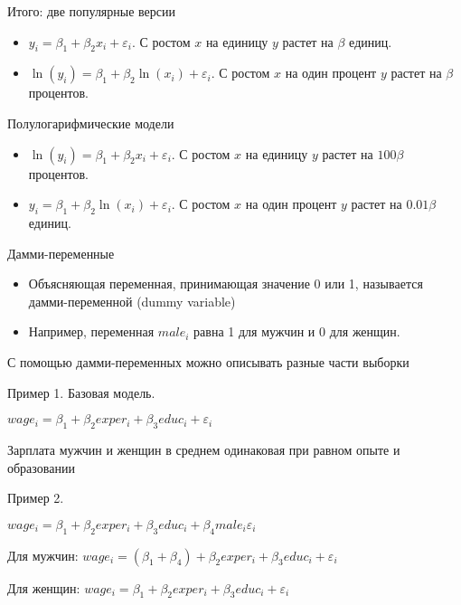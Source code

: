 \documentclass[ignorenonframetext,]{beamer}
\begin{document}
\begin{frame}{Итого: две популярные версии}

\begin{itemize}
\item
  $y_i = \beta_1 + \beta_2 x_i + \varepsilon_i$. С ростом $x$ на единицу
  $y$ растет на $\beta$ единиц.
\item
  $\ln( y_i) = \beta_1 + \beta_2 \ln( x_i) + \varepsilon_i$. С ростом
  $x$ на один процент $y$ растет на $\beta$ процентов.
\end{itemize}

\end{frame}

\begin{frame}{Полулогарифмические модели}

\begin{itemize}
\item
  $\ln( y_i) = \beta_1 + \beta_2 x_i + \varepsilon_i$. С ростом $x$ на
  единицу $y$ растет на $100\beta$ процентов.
\item
  $y_i = \beta_1 + \beta_2 \ln( x_i) + \varepsilon_i$. С ростом $x$ на
  один процент $y$ растет на $0.01\beta$ единиц.
\end{itemize}

\end{frame}

\begin{frame}{Дамми-переменные}

\begin{itemize}
\item
  Объясняющая переменная, принимающая значение 0 или 1, называется
  дамми-переменной (dummy variable)
\item
  Например, переменная $male_i$ равна 1 для мужчин и 0 для женщин.
\end{itemize}

\end{frame}

\begin{frame}{С помощью дамми-переменных можно описывать разные части
выборки}

Пример 1. Базовая модель.

$wage_i = \beta_1 + \beta_2 exper_i + \beta_3 educ_i + \varepsilon_i$

Зарплата мужчин и женщин в среднем одинаковая при равном опыте и
образовании

\end{frame}

\begin{frame}{Пример 2.}

$wage_i = \beta_1 + \beta_2 exper_i + \beta_3 educ_i + \beta_4 male_i \varepsilon_i$

Для мужчин:
$wage_i = (\beta_1+\beta_4) + \beta_2 exper_i + \beta_3 educ_i + \varepsilon_i$

Для женщин:
$wage_i = \beta_1 + \beta_2 exper_i + \beta_3 educ_i + \varepsilon_i$

\end{frame}
\end{document}

